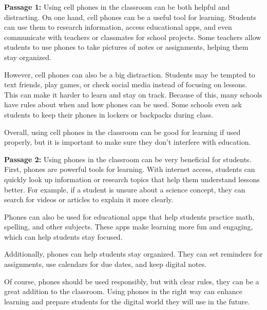 \documentclass[12pt]{article}
\begin{document}
\begin{tcolorbox}[colframe=black!60, colback=white, 
coltitle=black, colbacktitle=black!15, fonttitle=\bfseries\Large, 
title=Text: Using Cellphones in the Classroom, halign title=center, left=10pt, right=10pt, top=10pt, bottom=15pt]
\textbf{Passage 1: } Using cell phones in the classroom can be both helpful and distracting. On one hand, cell phones can be a useful tool for learning. Students can use them to research information, access educational apps, and even communicate with teachers or classmates for school projects. Some teachers allow students to use phones to take pictures of notes or assignments, helping them stay organized.

However, cell phones can also be a big distraction. Students may be tempted to text friends, play games, or check social media instead of focusing on lessons. This can make it harder to learn and stay on track. Because of this, many schools have rules about when and how phones can be used. Some schools even ask students to keep their phones in lockers or backpacks during class.

Overall, using cell phones in the classroom can be good for learning if used properly, but it is important to make sure they don’t interfere with education.

\vspace{1em}

 \textbf{Passage 2: }Using phones in the classroom can be very beneficial for students. First, phones are powerful tools for learning. With internet access, students can quickly look up information or research topics that help them understand lessons better. For example, if a student is unsure about a science concept, they can search for videos or articles to explain it more clearly.

Phones can also be used for educational apps that help students practice math, spelling, and other subjects. These apps make learning more fun and engaging, which can help students stay focused.

Additionally, phones can help students stay organized. They can set reminders for assignments, use calendars for due dates, and keep digital notes.

Of course, phones should be used responsibly, but with clear rules, they can be a great addition to the classroom. Using phones in the right way can enhance learning and prepare students for the digital world they will use in the future.


 
\end{tcolorbox}
\end{document}
